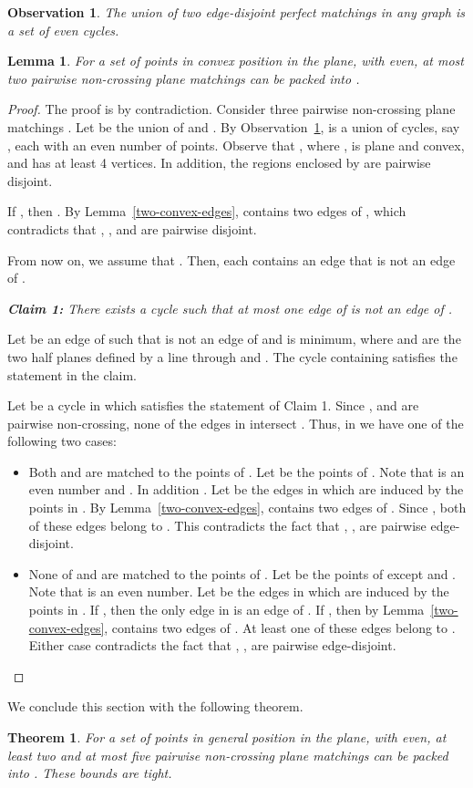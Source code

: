 \documentclass[11pt,a4paper]{article}
\newcommand{\CH}[1]{\text{}}
\newtheorem{lemma}{Lemma}
\newtheorem{theorem}{Theorem}
\newtheorem{observation}{Observation}
\begin{document}
\begin{observation}
\label{even-cycle-obs}
The union of two edge-disjoint perfect matchings in any graph is a set of even cycles.
\end{observation}

\begin{lemma}
 \label{2-non-crossing}
For a set  of  points in convex position in the plane, with  even, at most two pairwise non-crossing plane matchings can be packed into .
\end{lemma}
\begin{proof}
 The proof is by contradiction. Consider three pairwise non-crossing plane matchings . Let  be the union of  and . By Observation~\ref{even-cycle-obs},  is a union of cycles, say , each with an even number of points. Observe that , where , is plane and convex, and has at least 4 vertices. 
In addition, the regions enclosed by  are pairwise disjoint.


If , then . By Lemma~\ref{two-convex-edges},  contains two edges of , which contradicts that , , and  are pairwise disjoint. 

From now on, we assume that . Then, each  contains an edge that is not an edge of \CH{P}.


\vspace{10pt}
{\em {\bf Claim 1:} There exists a cycle  such that at most one edge of  is not an edge of \CH{P}.}

Let  be an edge of  such that  is not an edge of \CH{P} and  is minimum, where  and  are the two half planes defined by a line through  and . The cycle containing  satisfies the statement in the claim.
\vspace{10pt}

Let  be a cycle in  which satisfies the statement of Claim 1. Since ,  and  are pairwise non-crossing, none of the edges in  intersect . Thus, in  we have one of the following two cases:
\begin{itemize}
 \item Both  and  are matched to the points of . Let  be the points of . Note that  is an even number and . In addition . Let  be the edges in  which are induced by the points in . By Lemma~\ref{two-convex-edges},  contains two edges of \CH{P'}. Since , both of these edges belong to . This contradicts the fact that , ,  are pairwise edge-disjoint.
 \item None of  and  are matched to the points of . Let  be the points of  except  and . Note that  is an even number. Let  be the edges in  which are induced by the points in . If , then the only edge in  is an edge of . If , then by Lemma~\ref{two-convex-edges},  contains two edges of \CH{P'}. At least one of these edges belong to . Either case contradicts the fact that , ,  are pairwise edge-disjoint.
\end{itemize}
\end{proof}
We conclude this section with the following theorem.
\begin{theorem}
For a set  of  points in general position in the plane, with  even, at least two and at most five pairwise non-crossing plane matchings can be packed into . These bounds are tight.
\end{theorem}
\end{document}

